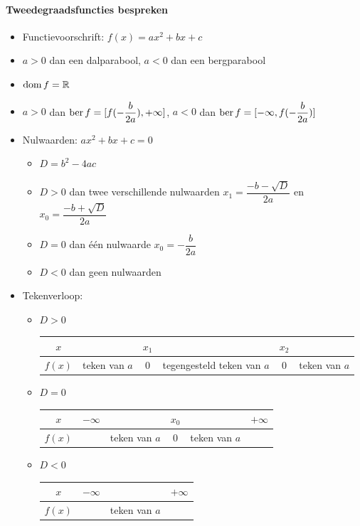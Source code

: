 \documentclass[12pt]{article}
\begin{document}
\pagebreak
\paragraph*{Tweedegraadsfuncties bespreken}
\begin{mdframed}
  \begin{itemize}
  \item Functievoorschrift: $f(x)=ax^2 + bx + c$
  \item $a>0$ dan een dalparabool, $a<0$ dan een bergparabool
  \item $\dom f = \mathbb{R}$
  \item $a>0$ dan $\ber f = [f(-\dfrac{b}{2a}), +\infty]$, $a<0$ dan $\ber f = [-\infty, f(-\dfrac{b}{2a})]$
  \item Nulwaarden: $ax^2+bx+c=0$
    \renewcommand{\labelitemii}{$\bullet$}
    \begin{itemize}
    \item $D=b^2-4ac$
    \item $D>0$ dan twee verschillende nulwaarden $x_1=\dfrac{-b-\sqrt{D}}{2a}$ en $x_0=\dfrac{-b+\sqrt{D}}{2a}$
    \item $D=0$ dan één nulwaarde $x_0=-\dfrac{b}{2a}$
    \item $D<0$ dan geen nulwaarden
    \end{itemize}
  \item Tekenverloop:
    \begin{itemize}
    \item $D>0$
      \begin{tabular}{c|p{1.5cm}cp{2.5cm}cp{1.5cm}}
        $x$ & & $x_1$ & & $x_2$ &\\
        \hline
        $f(x)$ & teken van $a$ & 0 & tegengesteld teken van $a$ & 0 & teken van $a$
      \end{tabular}
    \item $D=0$
      \begin{tabular}{c|lp{1.5cm}cp{1.5cm}r}
        $x$ & $-\infty$ & & $x_0$ & & $+\infty$\\
        \hline
        $f(x)$ & & teken van $a$ & 0 & teken van $a$ &
      \end{tabular}
    \item $D<0$
      \begin{tabular}{c|lcr}
        $x$ & $-\infty$ &  & $+\infty$\\
        \hline
        $f(x)$ & & teken van $a$ &
      \end{tabular}
    \end{itemize}

\end{itemize}
\end{mdframed}
\end{document}
